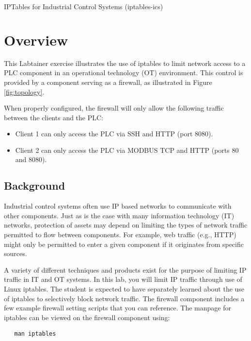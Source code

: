 


\begin{center}
{\LARGE IPTables for Industrial Control Systems (iptables-ics)}
\vspace{0.1in}\\
\end{center}


\section{Overview}
This Labtainer exercise illustrates the use of iptables
to limit network access to a PLC component in an operational
technology (OT) environment. This control is provided by 
a component serving as a firewall, as illustrated in Figure 
\ref{fig:topology}.

When properly configured, the firewall will only allow the following traffic
between the clients and the PLC:
\begin{itemize}
\item Client 1 can only access the PLC via SSH and HTTP (port 8080).
\item Client 2 can only access the PLC via MODBUS TCP and HTTP (ports 80 and 8080).
\end{itemize}

\subsection {Background}
Industrial control systems often use IP based networks to communicate with
other components.  Just as is the case with many information technology (IT) networks,
protection of assets may depend on limiting the types of network traffic 
permitted to flow between components.  For example, web traffic (e.g., HTTP)
might only be permitted to enter a given component if it originates from specific
sources.

A variety of different techniques and products exist for the purpose of limiting
IP traffic in IT and OT systems.  In this lab, you will limit IP traffic through
use of Linux iptables.  
The student is expected to have separately learned about the use of iptables
to selectively block network traffic. The firewall component includes a few
example firewall setting scripts that you can reference.  The manpage for iptables can be viewed on the
firewall component using:
\begin{verbatim}
   man iptables
\end{verbatim}

